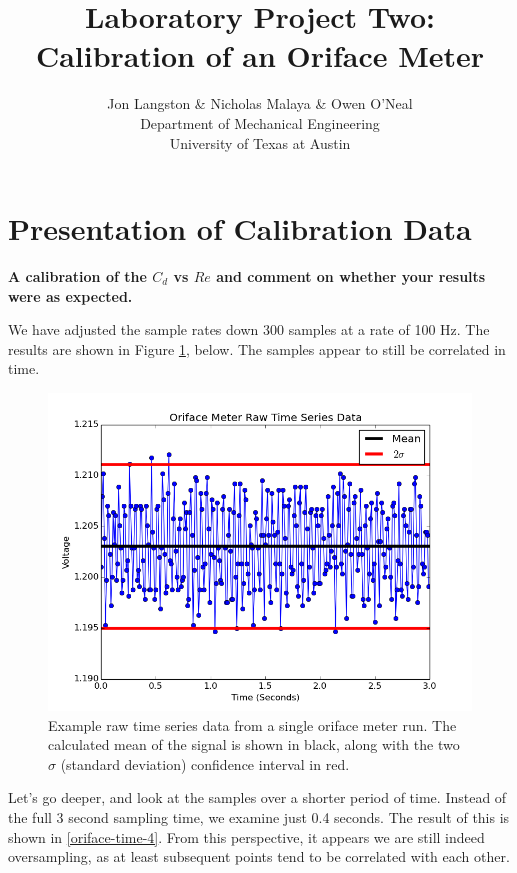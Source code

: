 \documentclass{article}
\title{\bf{Laboratory Project Two: Calibration of an Oriface Meter}}
\author{Jon Langston \& Nicholas Malaya \& Owen O'Neal \\ Department of Mechanical Engineering \\ University of Texas at Austin} \date{}
\begin{document}
\maketitle
\date{}
\newpage
\section{Presentation of Calibration Data}

\textbf{A calibration of the $C_d$ vs $Re$ and comment on whether your
results were as expected.}   

We have adjusted the sample rates down  300 samples at a rate of 100
Hz. The results are shown in Figure 
\ref{oriface-time}, below. The samples appear to still be correlated in
time. 

\begin{figure}[!htb]
  \begin{center}
    \includegraphics[width = 12 cm]{figs/oriface_time.png}
    \caption{Example raw time series data from a single oriface meter 
      run. The calculated mean of the signal is shown in black, along with
      the two $\sigma$ (standard deviation) confidence interval in
      red.}
    \label{oriface-time}
  \end{center}
\end{figure}

Let's go deeper, and look at the samples over a shorter period of time. Instead of the full 3 
second sampling time, we examine just 0.4 seconds. The result of this is shown in \ref{oriface-time-4}.
From this perspective, it appears we are still indeed oversampling, as at least subsequent points 
tend to be correlated with each other. 
\end{document}
